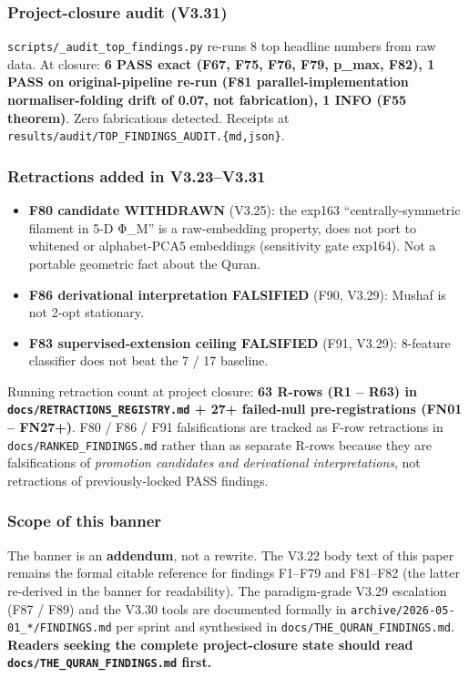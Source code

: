 \documentclass[
]{article}
\providecommand{\tightlist}{%
  \setlength{\itemsep}{0pt}\setlength{\parskip}{0pt}}
\begin{document}
\subsubsection{Project-closure audit
(V3.31)}\label{project-closure-audit-v3.31}

\texttt{scripts/\_audit\_top\_findings.py} re-runs 8 top headline
numbers from raw data. At closure: \textbf{6 PASS exact (F67, F75, F76,
F79, p\_max, F82), 1 PASS on original-pipeline re-run (F81
parallel-implementation normaliser-folding drift of 0.07, not
fabrication), 1 INFO (F55 theorem)}. Zero fabrications detected.
Receipts at \texttt{results/audit/TOP\_FINDINGS\_AUDIT.\{md,json\}}.

\subsubsection{Retractions added in
V3.23--V3.31}\label{retractions-added-in-v3.23v3.31}

\begin{itemize}
\tightlist
\item
  \textbf{F80 candidate WITHDRAWN} (V3.25): the exp163
  ``centrally-symmetric filament in 5-D Φ\_M'' is a raw-embedding
  property, does not port to whitened or alphabet-PCA5 embeddings
  (sensitivity gate exp164). Not a portable geometric fact about the
  Quran.
\item
  \textbf{F86 derivational interpretation FALSIFIED} (F90, V3.29):
  Mushaf is not 2-opt stationary.
\item
  \textbf{F83 supervised-extension ceiling FALSIFIED} (F91, V3.29):
  8-feature classifier does not beat the 7 / 17 baseline.
\end{itemize}

Running retraction count at project closure: \textbf{63 R-rows (R1 --
R63) in \texttt{docs/RETRACTIONS\_REGISTRY.md} + 27+ failed-null
pre-registrations (FN01 -- FN27+)}. F80 / F86 / F91 falsifications are
tracked as F-row retractions in \texttt{docs/RANKED\_FINDINGS.md} rather
than as separate R-rows because they are falsifications of
\emph{promotion candidates and derivational interpretations}, not
retractions of previously-locked PASS findings.

\subsubsection{Scope of this banner}\label{scope-of-this-banner}

The banner is an \textbf{addendum}, not a rewrite. The V3.22 body text
of this paper remains the formal citable reference for findings F1--F79
and F81--F82 (the latter re-derived in the banner for readability). The
paradigm-grade V3.29 escalation (F87 / F89) and the V3.30 tools are
documented formally in \texttt{archive/2026-05-01\_*/FINDINGS.md} per
sprint and synthesised in \texttt{docs/THE\_QURAN\_FINDINGS.md}.
\textbf{Readers seeking the complete project-closure state should read
\texttt{docs/THE\_QURAN\_FINDINGS.md} first.}
\end{document}
